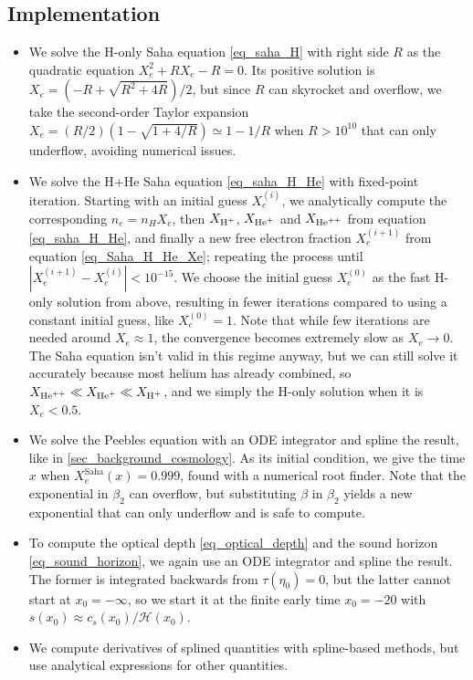 \documentclass[10pt,a4paper]{article}
\begin{document}
\subsection{Implementation}

\begin{itemize}
\item
We solve the H-only Saha equation \eqref{eq_saha_H}
with right side $R$
as the quadratic equation $X_e^2 + R X_e - R = 0$.
Its positive solution is $X_e = (-R + \sqrt{R^2+4R})/2$,
but since $R$ can skyrocket and overflow,
we take the second-order Taylor expansion $X_e = (R/2) (1 - \sqrt{1 + 4/R}) \simeq 1 - 1/R$
when $R > 10^{10}$ that can only underflow, avoiding numerical issues.

\item
We solve the H+He Saha equation \eqref{eq_saha_H_He} with fixed-point iteration.
Starting with an initial guess $X_e^{(i)}$,
we analytically compute the corresponding $n_e = n_H X_e$,
then $X_{\text{H}^+}$, $X_{\text{He}^+}$ and $X_{\text{He}^{++}}$ from equation \eqref{eq_saha_H_He},
and finally a new free electron fraction $X_e^{(i+1)}$ from equation \eqref{eq_Saha_H_He_Xe};
repeating the process until $|X_e^{(i+1)}-X_e^{(i)}| < 10^{-15}$.
We choose the initial guess $X_e^{(0)}$ as the fast H-only solution from above,
resulting in fewer iterations compared to using a constant initial guess, like $X_e^{(0)} = 1$.
Note that while few iterations are needed around $X_e \approx 1$,
the convergence becomes extremely slow as $X_e \rightarrow 0$.
The Saha equation isn't valid in this regime anyway,
but we can still solve it accurately because most helium has already combined,
so $X_{\text{He}^{++}} \ll X_{\text{He}^+} \ll X_{\text{H}^+}$, and we simply the H-only solution when it is $X_e < 0.5$.

\item
We solve the Peebles equation with an ODE integrator and spline the result, like in \cref{sec_background_cosmology}.
As its initial condition, we give the time $x$ when $X_e^\text{Saha}(x) = 0.999$, found with a numerical root finder.
Note that the exponential in $\beta_2$ can overflow,
but substituting $\beta$ in $\beta_2$ yields a new exponential that can only underflow and is safe to compute.

\item
To compute the optical depth \eqref{eq_optical_depth} and the sound horizon \eqref{eq_sound_horizon},
we again use an ODE integrator and spline the result.
The former is integrated backwards from $\tau(\eta_0)=0$,
but the latter cannot start at $x_0 = -\infty$,
so we start it at the finite early time $x_0 = -20$ with $s(x_0) \approx c_s(x_0) / \mathcal{H}(x_0)$.

\item
We compute derivatives of splined quantities with spline-based methods,
but use analytical expressions for other quantities.
\end{itemize}
\end{document}
